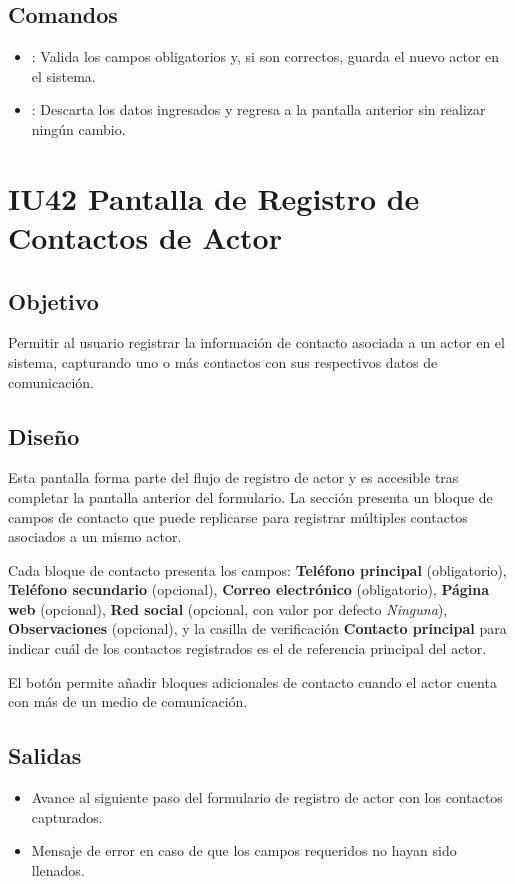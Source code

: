 \subsection{Comandos}
\begin{itemize}
	\item {}: Valida los campos obligatorios y, si son 
	correctos, guarda el nuevo actor en el sistema.
	\item {}: Descarta los datos ingresados y regresa a la 
	pantalla anterior sin realizar ningún cambio.
\end{itemize}
\section{IU42 Pantalla de Registro de Contactos de Actor}
\subsection{Objetivo}
Permitir al usuario registrar la información de contacto asociada a un actor en 
el sistema, capturando uno o más contactos con sus respectivos datos de 
comunicación.

\subsection{Diseño}
Esta pantalla  forma 
parte del flujo de registro de actor y es accesible tras completar la pantalla 
anterior del formulario. La sección presenta un bloque de campos de contacto 
que puede replicarse para registrar múltiples contactos asociados a un mismo 
actor.

Cada bloque de contacto presenta los campos: \textbf{Teléfono principal} 
(obligatorio), \textbf{Teléfono secundario} (opcional), \textbf{Correo 
	electrónico} (obligatorio), \textbf{Página web} (opcional), \textbf{Red social} 
(opcional, con valor por defecto \textit{Ninguna}), \textbf{Observaciones} 
(opcional), y la casilla de verificación \textbf{Contacto principal} para 
indicar cuál de los contactos registrados es el de referencia principal del 
actor.

El botón  permite añadir bloques adicionales de 
contacto cuando el actor cuenta con más de un medio de comunicación.


\subsection{Salidas}
\begin{itemize}
	\item Avance al siguiente paso del formulario de registro de actor con los 
	contactos capturados.
	\item Mensaje de error  en 
	caso de que los campos requeridos no hayan sido llenados.
\end{itemize}

